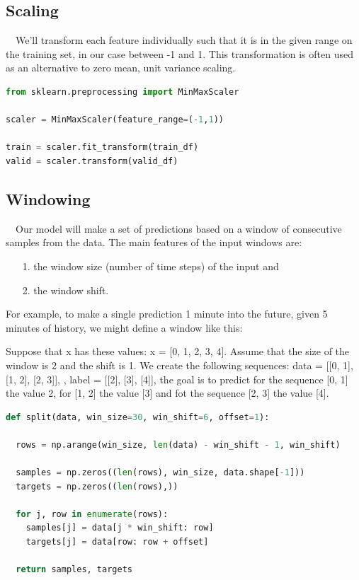 \subsection*{Scaling}\label{Scaling}

~~We'll transform each feature individually such that it is in the given range on the training set, in our case between -1 and 1. This transformation is often used as an alternative to zero mean, unit variance scaling.

\begin{lstlisting}[language=Python]
from sklearn.preprocessing import MinMaxScaler

scaler = MinMaxScaler(feature_range=(-1,1))

train = scaler.fit_transform(train_df)
valid = scaler.transform(valid_df)
\end{lstlisting}

\subsection*{Windowing}\label{Windowing}

~~Our model will make a set of predictions based on a window of consecutive samples from the data. The main features of the input windows are:

\begin{itemize}
  \item[1.] the window size (number of time steps) of the input and
  \item[2.] the window shift.
\end{itemize}

For example, to make a single prediction 1 minute into the future, given 5 minutes of history, we might define a window like this:

Suppose that x has these values: x = [0, 1, 2, 3, 4]. Assume that the size of the window is 2 and the shift is 1. We create the following sequences: data = [[0, 1], [1, 2], [2, 3]], , label = [[2], [3], [4]], the goal is to predict for the sequence [0, 1] the value 2, for [1, 2] the value [3] and fot the sequence [2, 3] the value [4].


\begin{lstlisting}[language=Python]
def split(data, win_size=30, win_shift=6, offset=1):

  rows = np.arange(win_size, len(data) - win_shift - 1, win_shift)

  samples = np.zeros((len(rows), win_size, data.shape[-1]))
  targets = np.zeros((len(rows),))

  for j, row in enumerate(rows):
    samples[j] = data[j * win_shift: row]
    targets[j] = data[row: row + offset]

  return samples, targets
\end{lstlisting}





